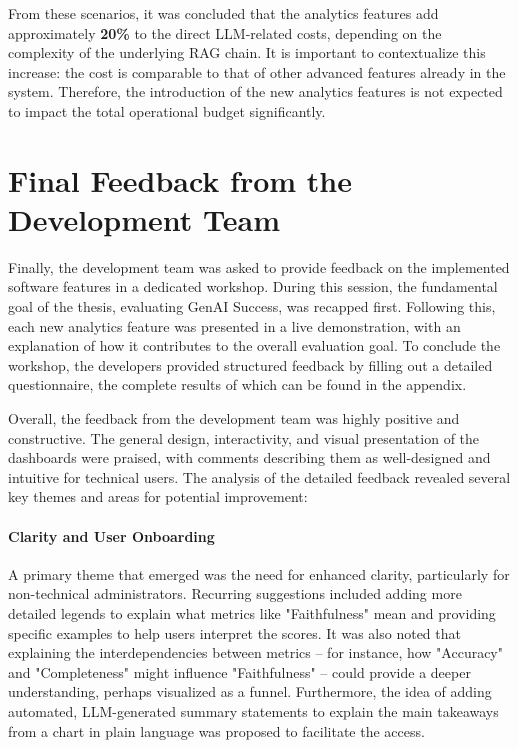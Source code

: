 \documentclass[
	english,
	ruledheaders=section,%
	class=report,%
	thesis={type=bachelor},%
	accentcolor=1b,%
	custommargins=true,%
	marginpar=false,%
	parskip=half-,%
	fontsize=11pt,%
	DIV=14,
]{tudapub}
\begin{document}
From these scenarios, it was concluded that the analytics features add approximately \textbf{20\%} to the direct LLM-related costs, depending on the complexity of the underlying RAG chain. It is important to contextualize this increase: the cost is comparable to that of other advanced features already in the system. Therefore, the introduction of the new analytics features is not expected to impact the total operational budget significantly.

\section{Final Feedback from the Development Team}
Finally, the development team was asked to provide feedback on the implemented software features in a dedicated workshop. During this session, the fundamental goal of the thesis, evaluating GenAI Success, was recapped first. Following this, each new analytics feature was presented in a live demonstration, with an explanation of how it contributes to the overall evaluation goal. To conclude the workshop, the developers provided structured feedback by filling out a detailed questionnaire, the complete results of which can be found in the appendix.

Overall, the feedback from the development team was highly positive and constructive. The general design, interactivity, and visual presentation of the dashboards were praised, with comments describing them as well-designed and intuitive for technical users. The analysis of the detailed feedback revealed several key themes and areas for potential improvement:

\paragraph{Clarity and User Onboarding} A primary theme that emerged was the need for enhanced clarity, particularly for non-technical administrators. Recurring suggestions included adding more detailed legends to explain what metrics like "Faithfulness" mean and providing specific examples to help users interpret the scores. It was also noted that explaining the interdependencies between metrics -- for instance, how "Accuracy" and "Completeness" might influence "Faithfulness" -- could provide a deeper understanding, perhaps visualized as a funnel. Furthermore, the idea of adding automated, LLM-generated summary statements to explain the main takeaways from a chart in plain language was proposed to facilitate the access.
\end{document}
